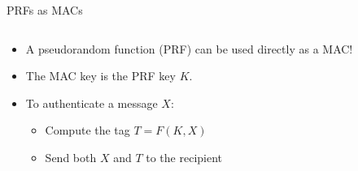 \documentclass[aspectratio=169, lualatex, handout]{beamer}
\begin{document}
\begin{frame}{PRFs as MACs}
	\begin{columns}[c]
		\begin{column}{0.4\textwidth}
			\begin{itemize}
				\item A pseudorandom function (PRF) can be used directly as a MAC!
				\item The MAC key is the PRF key $K$.
				\item To authenticate a message $X$:
				      \begin{itemize}
					      \item Compute the tag $T = F(K, X)$
					      \item Send both $X$ and $T$ to the recipient
				      \end{itemize}
			\end{itemize}
		\end{column}
		\begin{column}{0.6\textwidth}
			\begin{flushright}
			\end{flushright}
		\end{column}
	\end{columns}
\end{frame}
\end{document}

